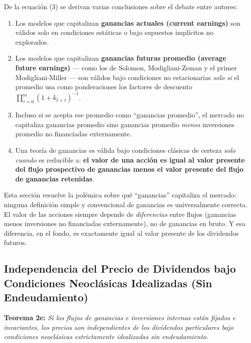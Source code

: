 \documentclass[12pt]{article}
\begin{document}
De la ecuaci\'on (3) se derivan varias conclusiones sobre el debate entre autores:

\begin{enumerate}
  \item Los modelos que capitalizan \textbf{ganancias actuales (current earnings)} son v\'alidos solo en condiciones est\'aticas o bajo supuestos impl\'icitos no explorados.

  \item Los modelos que capitalizan \textbf{ganancias futuras promedio (average future earnings)} --- como los de Solomon, Modigliani-Zeman y el primer Modigliani-Miller --- son v\'alidos bajo condiciones no estacionarias \textit{solo si} el promedio usa como ponderaciones los factores de descuento $\prod_{\tau=0}^{m}(1+k_{t+\tau})^{-1}$.

  \item Incluso si se acepta ese promedio como ``ganancias promedio'', el mercado no capitaliza ganancias promedio sino ganancias promedio \textit{menos} inversiones promedio no financiadas externamente.

  \item Una teor\'ia de ganancias es v\'alida bajo condiciones cl\'asicas de certeza \textit{solo cuando} es reducible a: \textbf{el valor de una acci\'on es igual al valor presente del flujo prospectivo de ganancias menos el valor presente del flujo de ganancias retenidas}.
\end{enumerate}

\begin{intuicion}
Esta secci\'on resuelve la pol\'emica sobre qu\'e ``ganancias'' capitaliza el mercado: ninguna definici\'on simple y convencional de ganancias es universalmente correcta. El valor de las acciones siempre depende de \textit{diferencias} entre flujos (ganancias menos inversiones no financiadas externamente), no de ganancias en bruto. Y esa diferencia, en el fondo, es exactamente igual al valor presente de los dividendos futuros.
\end{intuicion}

\subsection{Independencia del Precio de Dividendos bajo Condiciones Neocl\'asicas Idealizadas (Sin Endeudamiento)}

\textbf{Teorema 2e:} \textit{Si los flujos de ganancias e inversiones internas est\'an fijados e invariantes, los precios son independientes de los dividendos particulares bajo condiciones neocl\'asicas estrictamente idealizadas sin endeudamiento.}
\end{document}

